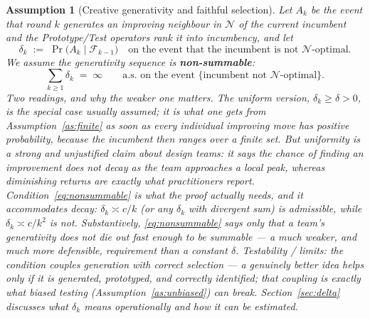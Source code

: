 \documentclass[11pt]{article}
\newtheorem{assumption}{Assumption}
\newcommand{\filt}{\mathcal{F}}     %
\begin{document}
\begin{assumption}[Creative generativity and faithful selection]
\label{as:creative}
Let $A_k$ be the event that round $k$ generates an improving neighbour in $\mathcal{N}$ of the current incumbent \emph{and} the Prototype/Test operators rank it into incumbency, and let
\[
\delta_k \;:=\; \Pr\!\big(A_k \mid \filt_{k-1}\big)
\quad\text{on the event that the incumbent is not $\mathcal{N}$-optimal.}
\]
We assume the generativity sequence is \textbf{non-summable}:
\begin{equation}
\label{eq:nonsummable}
\sum_{k\ge1}\delta_k \;=\; \infty \qquad\text{a.s.\ on the event }\{\text{incumbent not $\mathcal{N}$-optimal}\}.
\end{equation}
\emph{Two readings, and why the weaker one matters.} The \emph{uniform} version, $\delta_k\ge\delta>0$, is the special case usually assumed; it is what one gets from Assumption~\ref{as:finite} as soon as every individual improving move has positive probability, because the incumbent then ranges over a finite set. But uniformity is a strong and unjustified claim about design teams: it says the chance of finding an improvement does \emph{not} decay as the team approaches a local peak, whereas diminishing returns are exactly what practitioners report. Condition~\eqref{eq:nonsummable} is what the proof actually needs, and it accommodates decay: $\delta_k\asymp c/k$ (or any $\delta_k$ with divergent sum) is admissible, while $\delta_k\asymp c/k^{2}$ is not. Substantively, \eqref{eq:nonsummable} says only that a team's generativity does not die out \emph{fast enough to be summable} --- a much weaker, and much more defensible, requirement than a constant $\delta$.
\emph{Testability / limits:} the condition couples generation with correct selection --- a genuinely better idea helps only if it is generated, prototyped, \emph{and} correctly identified; that coupling is exactly what biased testing (Assumption~\ref{as:unbiased}) can break. Section~\ref{sec:delta} discusses what $\delta_k$ means operationally and how it can be estimated.
\end{assumption}
\end{document}
